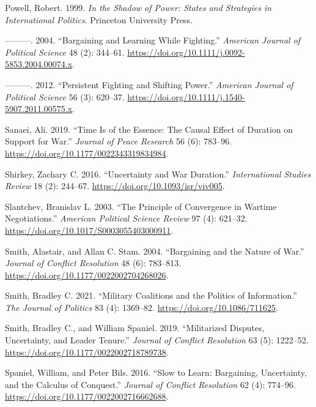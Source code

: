 \documentclass[
  12pt,
]{article}
\newlength{\cslhangindent}
\newenvironment{CSLReferences}[2] %
 {\begin{list}{}{%
  \setlength{\itemindent}{0pt}
  \setlength{\leftmargin}{0pt}
  \setlength{\parsep}{0pt}
  \ifodd #1
   \setlength{\leftmargin}{\cslhangindent}
   \setlength{\itemindent}{-1\cslhangindent}
  \fi
  \setlength{\itemsep}{#2\baselineskip}}}
 {\end{list}}
\theoremstyle{plain}
\theoremstyle{plain}
\theoremstyle{remark}
\begin{document}
\begin{CSLReferences}{1}{0}
Powell, Robert. 1999. \emph{In the Shadow of Power: {States} and
Strategies in International Politics}. Princeton University Press.

---------. 2004. {``Bargaining and {Learning While Fighting}.''}
\emph{American Journal of Political Science} 48 (2): 344--61.
\url{https://doi.org/10.1111/j.0092-5853.2004.00074.x}.

---------. 2012. {``Persistent {Fighting} and {Shifting Power}.''}
\emph{American Journal of Political Science} 56 (3): 620--37.
\url{https://doi.org/10.1111/j.1540-5907.2011.00575.x}.

Sanaei, Ali. 2019. {``Time Is of the Essence: {The} Causal Effect of
Duration on Support for War.''} \emph{Journal of Peace Research} 56 (6):
783--96. \url{https://doi.org/10.1177/0022343319834984}.

Shirkey, Zachary C. 2016. {``Uncertainty and {War Duration}.''}
\emph{International Studies Review} 18 (2): 244--67.
\url{https://doi.org/10.1093/isr/viv005}.

Slantchev, Branislav L. 2003. {``The {Principle} of {Convergence} in
{Wartime Negotiations}.''} \emph{American Political Science Review} 97
(4): 621--32. \url{https://doi.org/10.1017/S0003055403000911}.

Smith, Alastair, and Allan C. Stam. 2004. {``Bargaining and the {Nature}
of {War}.''} \emph{Journal of Conflict Resolution} 48 (6): 783--813.
\url{https://doi.org/10.1177/0022002704268026}.

Smith, Bradley C. 2021. {``Military {Coalitions} and the {Politics} of
{Information}.''} \emph{The Journal of Politics} 83 (4): 1369--82.
\url{https://doi.org/10.1086/711625}.

Smith, Bradley C., and William Spaniel. 2019. {``Militarized {Disputes},
{Uncertainty}, and {Leader Tenure}.''} \emph{Journal of Conflict
Resolution} 63 (5): 1222--52.
\url{https://doi.org/10.1177/0022002718789738}.

Spaniel, William, and Peter Bils. 2016. {``Slow to {Learn}:
{Bargaining}, {Uncertainty}, and the {Calculus} of {Conquest}.''}
\emph{Journal of Conflict Resolution} 62 (4): 774--96.
\url{https://doi.org/10.1177/0022002716662688}.


\end{CSLReferences}
\end{document}

